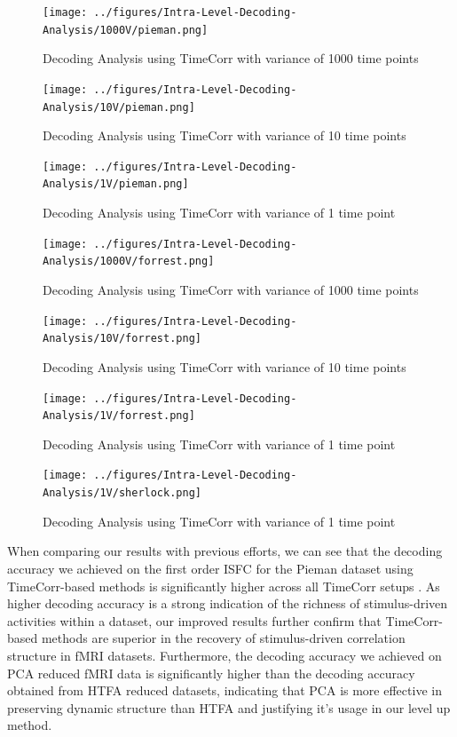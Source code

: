 \documentclass[11pt]{article}
\begin{document}
\begin{figure}[!htb]
\caption{Decoding Analysis using TimeCorr with variance of 1000 time points}
\centering
\texttt{[image: ../figures/Intra-Level-Decoding-Analysis/1000V/pieman.png]}
\label{fig:piemanDC1000}
\end{figure}

\begin{figure}[!htb]
\caption{Decoding Analysis using TimeCorr with variance of 10 time points}
\centering
\texttt{[image: ../figures/Intra-Level-Decoding-Analysis/10V/pieman.png]}
\label{fig:piemanDC10}
\end{figure}

\begin{figure}[!htb]
\caption{Decoding Analysis using TimeCorr with variance of 1 time point}
\centering
\texttt{[image: ../figures/Intra-Level-Decoding-Analysis/1V/pieman.png]}
\label{fig:piemanDC1}
\end{figure}

\begin{figure}[!htb]
\caption{Decoding Analysis using TimeCorr with variance of 1000 time points}
\centering
\texttt{[image: ../figures/Intra-Level-Decoding-Analysis/1000V/forrest.png]}
\label{fig:forrestDC1000}
\end{figure}

\begin{figure}[!htb]
\caption{Decoding Analysis using TimeCorr with variance of 10 time points}
\centering
\texttt{[image: ../figures/Intra-Level-Decoding-Analysis/10V/forrest.png]}
\label{fig:forrestDC10}
\end{figure}

\begin{figure}[!htb]
\caption{Decoding Analysis using TimeCorr with variance of 1 time point}
\centering
\texttt{[image: ../figures/Intra-Level-Decoding-Analysis/1V/forrest.png]}
\label{fig:forrestDC1}
\end{figure}

\begin{figure}[!htb]
\caption{Decoding Analysis using TimeCorr with variance of 1 time point}
\centering
\texttt{[image: ../figures/Intra-Level-Decoding-Analysis/1V/sherlock.png]}
\label{fig:sherlockDC1}
\end{figure}

When comparing our results with previous efforts, we can see that the decoding accuracy we achieved on the first order ISFC for the Pieman dataset using TimeCorr-based methods is significantly higher across all TimeCorr setups \cite{jeremy2017}. As higher decoding accuracy is a strong indication of the richness of stimulus-driven activities within a dataset, our improved results further confirm that TimeCorr-based methods are superior in the recovery of stimulus-driven correlation structure in fMRI datasets. Furthermore, the decoding accuracy we achieved on PCA reduced fMRI data is significantly higher than the decoding accuracy obtained from HTFA reduced datasets, indicating that PCA is more effective in preserving dynamic structure than HTFA and justifying it's usage in our level up method.
\end{document}
